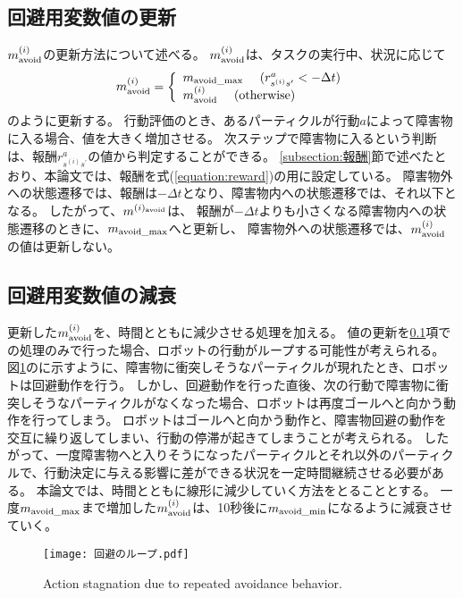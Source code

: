 \subsection{回避用変数値の更新} \label{subsection:回避用変数値の更新}
$m^{(i)}_{\rm avoid}$の更新方法について述べる。
$m^{(i)}_{\rm avoid}$は、タスクの実行中、状況に応じて
\begin{equation}
  m^{(i)}_{\rm avoid} =
  \left\{
    \begin{array}{l}
      m_{\rm avoid\_max} \ \ \ \ (r^{a}_{s^{(i)}s^{\prime}} < - \Delta t) \\
      m^{(i)}_{\rm avoid} \ \ \ \ ({\rm otherwise})
    \end{array}
  \right.
\end{equation}
のように更新する。
行動評価のとき、あるパーティクルが行動$a$によって障害物に入る場合、値を大きく増加させる。
次ステップで障害物に入るという判断は、報酬$r^{a}_{s^{(i)}s^{\prime}}$の値から判定することができる。
\ref{subsection:報酬}節で述べたとおり、本論文では、報酬を式(\ref{equation:reward})の用に設定している。
障害物外への状態遷移では、報酬は$-\Delta t$となり、障害物内への状態遷移では、それ以下となる。
したがって、$m^{(i)_{\rm avoid}}$は、
報酬が$-\Delta t$よりも小さくなる障害物内への状態遷移のときに、$m_{\rm avoid\_max}$へと更新し、
障害物外への状態遷移では、$m^{(i)}_{\rm avoid}$の値は更新しない。

\subsection{回避用変数値の減衰}
更新した$m^{(i)}_{\rm avoid}$を、時間とともに減少させる処理を加える。
値の更新を\ref{subsection:回避用変数値の更新}項での処理のみで行った場合、ロボットの行動がループする可能性が考えられる。
図\ref{fig:回避のループ}のに示すように、障害物に衝突しそうなパーティクルが現れたとき、ロボットは回避動作を行う。
しかし、回避動作を行った直後、次の行動で障害物に衝突しそうなパーティクルがなくなった場合、ロボットは再度ゴールへと向かう動作を行ってしまう。
ロボットはゴールへと向かう動作と、障害物回避の動作を交互に繰り返してしまい、行動の停滞が起きてしまうことが考えられる。
したがって、一度障害物へと入りそうになったパーティクルとそれ以外のパーティクルで、行動決定に与える影響に差ができる状況を一定時間継続させる必要がある。
本論文では、時間とともに線形に減少していく方法をとることとする。
一度$m_{\rm avoid\_max}$まで増加した$m^{(i)}_{\rm avoid}$は、10秒後に$m_{\rm avoid\_min}$になるように減衰させていく。

\begin{figure}[h]
  \begin{center}
    \texttt{[image: 回避のループ.pdf]}
    \caption{Action stagnation due to repeated avoidance behavior.}
    \label{fig:回避のループ}
  \end{center}
\end{figure}
